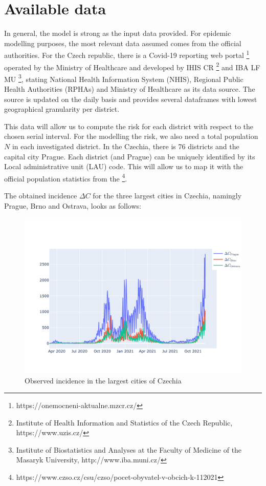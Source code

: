 \documentclass[
  digital, %
  table,   %
  twoside, %
  12pt,
  lof,     %
  lot,     %
]{fithesis3}
\begin{document}
\section{Available data}

In general, the model is strong as the input data provided.
For epidemic modelling purposes, the most relevant data 
assumed comes from the official authorities.
For the Czech republic, there is a Covid-19 reporting web 
portal \footnote{https://onemocneni-aktualne.mzcr.cz/} operated 
by the Ministry of Healthcare and developed by IHIS CR 
\footnote{Institute of Health Information and Statistics of the Czech Republic, https://www.uzis.cz/} 
and IBA LF MU 
\footnote{Institute of Biostatistics and Analyses at the Faculty of Medicine of the Masaryk University, http://www.iba.muni.cz/}, 
stating National Health Information System (NHIS), Regional Public 
Health Authorities (RPHAs) and Ministry of Healthcare as its 
data source. 
The source is updated on the daily basis and provides several 
dataframes with lowest geographical granularity per district.

This data will allow us to compute the risk for each district 
with respect to the chosen serial interval. 
For the modelling the risk, we also need a total population 
$N$ in each investigated district.
In the Czechia, there is 76 districts and the capital city Prague. 
Each district (and Prague) can be uniquely identified by its 
Local administrative unit (LAU) code. 
This will allow us to map it with the official population 
statistics from the \footnote{https://www.czso.cz/csu/czso/pocet-obyvatel-v-obcich-k-112021}.

The obtained incidence $\Delta C$ for the three largest 
cities in Czechia, namingly Prague, Brno and Ostrava, looks as 
follows:

\begin{figure}[h]
  \begin{center}
    \includegraphics[width=\textwidth]{images/largest-cities-incidence.png}
  \end{center}
  \caption{Observed incidence in the largest cities of Czechia}
  \label{fig:largest-cities-incidence}
\end{figure}
\end{document}
